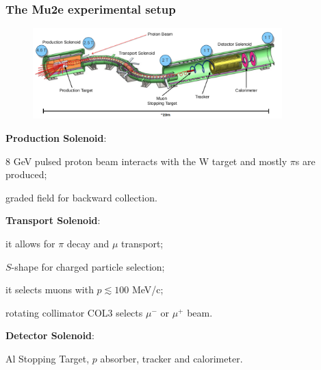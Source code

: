 \documentclass{beamer}
\begin{document}
\begin{frame}
    \frametitle{The Mu2e experimental setup}
    \vspace{-7mm}
     \begin{figure}[h]
            \centering
            \hspace*{-4ex}
            \includegraphics[width=1.1\framewidth, height=3.5cm ]{figures/png/Screenshot_20240913_162936.png}
        \end{figure}
                \setlength{\leftmargini}{-0.5em}
\vspace{-2mm}
        \begin{itemize}
        {\footnotesize
            \item \textbf{Production Solenoid}:}
            \begin{itemize}
                {\footnotesize  \item 8 GeV pulsed proton beam interacts with the W target and mostly $\pi$s are produced;
                \item graded field for backward collection.}
            \end{itemize}
            {\footnotesize \item \textbf{Transport Solenoid}:}
            \begin{itemize}
                {\footnotesize \item it allows for $\pi$ decay and $\mu$ transport;
                \item $S$-shape for charged particle selection;
                \item it selects muons with $p \lesssim 100 $ MeV/c;
                \item rotating collimator COL3 selects $\mu^-$ or $\mu^+$ beam.}
            \end{itemize}
\item  {\footnotesize \textbf{Detector Solenoid}: } 
\begin{itemize}
    {\footnotesize  \item Al Stopping Target, $p$ absorber, tracker and calorimeter.}
\end{itemize}
        \end{itemize}
\end{frame}
\end{document}
